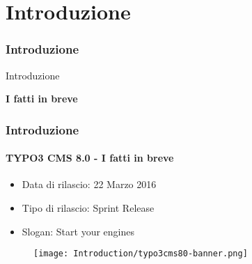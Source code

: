 %

\section{Introduzione}
\begin{frame}[fragile]
	\frametitle{Introduzione}

	\begin{center}\huge{Introduzione}\end{center}
	\begin{center}\huge{\color{typo3darkgrey}\textbf{I fatti in breve}}\end{center}

\end{frame}

\begin{frame}[fragile]
	\frametitle{Introduzione}
	\framesubtitle{TYPO3 CMS 8.0 - I fatti in breve}

	\begin{itemize}
		\item Data di rilascio: 22 Marzo 2016
		\item Tipo di rilascio: Sprint Release
		\item Slogan: Start your engines
	\end{itemize}

	\begin{figure}
		\texttt{[image: Introduction/typo3cms80-banner.png]}
	\end{figure}

\end{frame}

